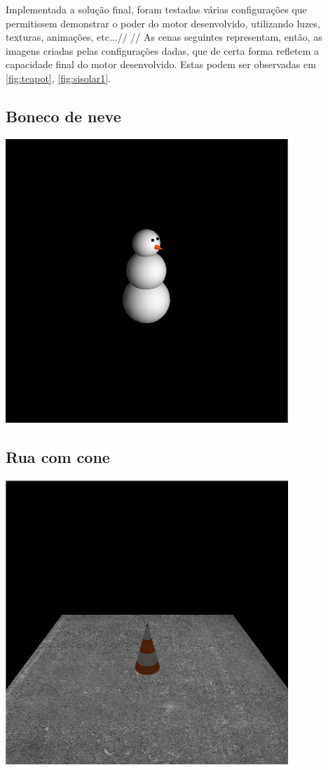 Implementada a solução final, foram testadas várias configurações
que permitissem demonstrar o poder do motor desenvolvido,
utilizando luzes, texturas, animações, etc...//
//
As cenas seguintes representam, então, as imagens criadas pelas
configurações dadas, que de certa forma refletem a capacidade
final do motor desenvolvido. Estas podem ser observadas em
\ref{fig:teapot}, \ref{fig:sisolar1}.

\subsection{Boneco de neve}

\begin{center}
    \includegraphics[width=0.8\textwidth]{imgs/boneco.png}
    \label{fig:teapot}
\end{center}

\subsection{Rua com cone}

\begin{center}
    \includegraphics[width=0.8\textwidth]{imgs/capa.png}
    \label{fig:sisolar1}
\end{center}

